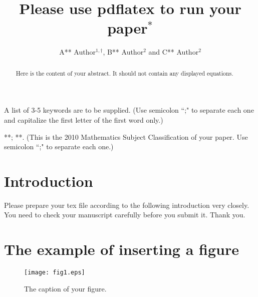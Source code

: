\documentclass{swufeMath}
\title{Please use pdflatex to run your paper$^*$}
\author{ A** Author$^{1,\dag}$, B** Author$^2$ and C** Author$^2$}%
\date{}
\begin{document}
\baselineskip 12pt

\maketitle
\begin{abstract}
Here is the  content of your abstract. It should not contain any displayed equations.
\end{abstract}

\begin{keyword}
A list of 3-5 keywords are to be supplied. (Use semicolon ``;" to separate each one and capitalize the first letter of the first word only.)
\end{keyword}

\begin{MSC}
**; **.
(This is the 2010 Mathematics Subject Classification of your paper. Use semicolon ``;" to separate each one.)
\end{MSC}


\thispagestyle{first}

\vspace{-2mm}


\section{Introduction}
Please prepare your tex file according to the following introduction
very closely. You need to check your manuscript carefully before you submit it. Thank you.



\section{The example of inserting a figure}
\begin{figure}[h!]
\centering
\texttt{[image: fig1.eps]}
\caption {The caption of your figure.}\label{fig1}
\end{figure}
\end{document}
